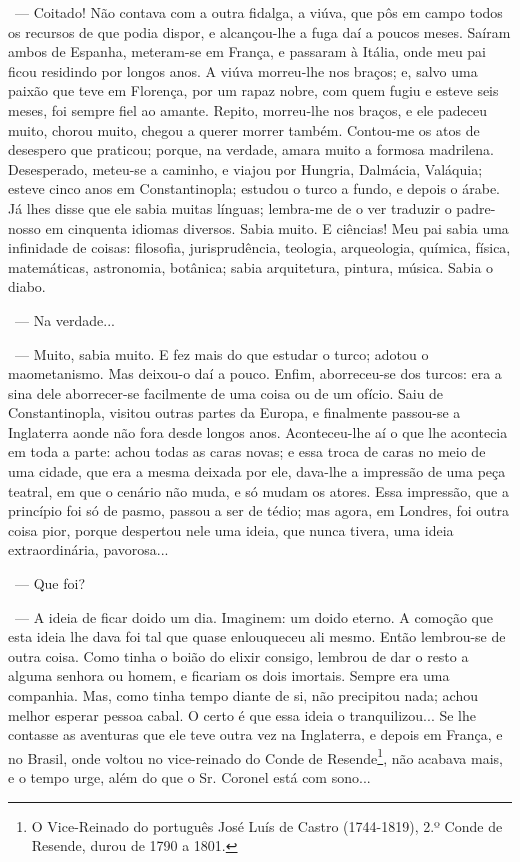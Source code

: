 ~--- Coitado! Não contava com a outra fidalga, a viúva, que pôs em campo
todos os recursos de que podia dispor, e alcançou-lhe a fuga daí a
poucos meses. Saíram ambos de Espanha, meteram-se em França, e passaram
à Itália, onde meu pai ficou residindo por longos anos. A viúva
morreu-lhe nos braços; e, salvo uma paixão que teve em Florença, por um
rapaz nobre, com quem fugiu e esteve seis meses, foi sempre fiel ao
amante. Repito, morreu-lhe nos braços, e ele padeceu muito, chorou
muito, chegou a querer morrer também. Contou-me os atos de desespero que
praticou; porque, na verdade, amara muito a formosa madrilena.
Desesperado, meteu-se a caminho, e viajou por Hungria, Dalmácia,
Valáquia; esteve cinco anos em Constantinopla; estudou o turco a fundo,
e depois o árabe. Já lhes disse que ele sabia muitas línguas; lembra-me
de o ver traduzir o padre-nosso em cinquenta idiomas diversos. Sabia
muito. E ciências! Meu pai sabia uma infinidade de coisas: filosofia,
jurisprudência, teologia, arqueologia, química, física, matemáticas,
astronomia, botânica; sabia arquitetura, pintura, música. Sabia o diabo.

~--- Na verdade...

~--- Muito, sabia muito. E fez mais do que estudar o turco; adotou o
maometanismo. Mas deixou-o daí a pouco. Enfim, aborreceu-se dos turcos:
era a sina dele aborrecer-se facilmente de uma coisa ou de um ofício.
Saiu de Constantinopla, visitou outras partes da Europa, e finalmente
passou-se a Inglaterra aonde não fora desde longos anos. Aconteceu-lhe
aí o que lhe acontecia em toda a parte: achou todas as caras novas; e
essa troca de caras no meio de uma cidade, que era a mesma deixada por
ele, dava-lhe a impressão de uma peça teatral, em que o cenário não
muda, e só mudam os atores. Essa impressão, que a princípio foi só de
pasmo, passou a ser de tédio; mas agora, em Londres, foi outra coisa
pior, porque despertou nele uma ideia, que nunca tivera, uma ideia
extraordinária, pavorosa...

~--- Que foi?

~--- A ideia de ficar doido um dia. Imaginem: um doido eterno. A comoção
que esta ideia lhe dava foi tal que quase enlouqueceu ali mesmo. Então
lembrou-se de outra coisa. Como tinha o boião do elixir consigo, lembrou
de dar o resto a alguma senhora ou homem, e ficariam os dois imortais.
Sempre era uma companhia. Mas, como tinha tempo diante de si, não
precipitou nada; achou melhor esperar pessoa cabal. O certo é que essa
ideia o tranquilizou... Se lhe contasse as aventuras que ele teve outra
vez na Inglaterra, e depois em França, e no Brasil, onde voltou no
vice-reinado do Conde de Resende\footnote{O Vice-Reinado do português
  José Luís de Castro (1744-1819), 2.º Conde de Resende, durou de 1790 a
  1801.}, não acabava mais, e o tempo urge, além do que o Sr. Coronel
está com sono...

